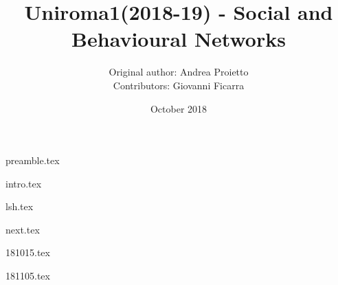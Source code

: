 \documentclass{report}
\title{Uniroma1(2018-19) - Social and Behavioural Networks}
\author{Original author: Andrea Proietto\\[3ex]
Contributors: Giovanni Ficarra}
\date{October 2018}
\begin{document}
\maketitle

\tableofcontents

{preamble.tex}

{intro.tex}
	
{lsh.tex}

{next.tex}

{181015.tex}

{181105.tex}
\end{document}

